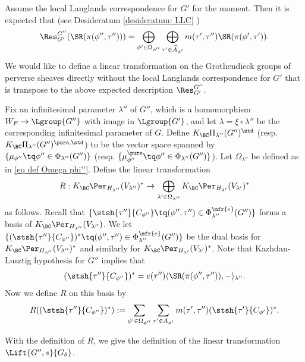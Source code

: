 \documentclass[11pt,letterpaper]{amsart}
\numberwithin{equation}{section}
\begin{document}
Assume the local Langlands correspondence for $G'$ for the moment. Then it is expected that (see Desideratum \ref{desideratum: LLC} \RES)
\[ \Res_{G'}^{G''} (\SR(\pi(\phi'', \tau'')))= \bigoplus_{\phi' \in \Omega_{\phi''} } \bigoplus_{\tau' \in  \widehat{A}_{\phi'}} m(\tau',\tau'') \SR(\pi(\phi', \tau')). \]
We would like to define a linear transformation on the Grothendieck groups of perverse sheaves directly without the local Langlands correspondence for $G'$ that is transpose to the above expected description $\Res_{G'}^{G''}$.

Fix an infinitesimal parameter $\lambda''$ of $G''$, which is a homomorphism $W_F \to \Lgroup{G''}$ with image in $\Lgroup{G'}$, and let $\lambda= \xi \circ \lambda''$ be the corresponding infinitesimal parameter of $G$.
Define $K_{\BC}\Pi_{\lambda''}(G'')^{\std}$ (resp. $K_{\BC}\Pi_{\lambda''}(G'')^{\pure,\std}$) to be the vector space spanned by $\{\mu_{\phi''} \tq \phi'' \in \Phi_{\lambda''}(G'')\}$ (resp. $\{\mu_{\phi''}^{\pure}\tq \phi'' \in \Phi_{\lambda''}(G'')\}$). Let $\Omega_{\lambda''}$ be defined as in \eqref{eq def Omega phi''}. 
Define the linear transformation 
\[ R: K_{\BC} \Per_{H_{\lambda''}}(V_{\lambda''})^{\ast} \to     \bigoplus_{\lambda' \in \Omega_{\lambda''}} K_{\BC} \Per_{H_{\lambda'}}(V_{\lambda'})^{\ast} \]
as follows. Recall that $\{\stsh{\tau''}{C_{\phi''}}\tq (\phi'',\tau'')\in \Phi_{\lambda''}^{\mfr{e}}(G'')\}$ forms a basis of $K_{\BC} \Per_{H_{\lambda''}}(V_{\lambda''})$. We let $\{ (\stsh{\tau''}{C_{\phi''}})^{\ast} \tq (\phi'',\tau'')\in \Phi_{\lambda''}^{\mfr{e}}(G'')\}$ be the dual basis for $K_{\BC} \Per_{H_{\lambda''}}(V_{\lambda''})^{\ast}$ and similarly for $K_{\BC} \Per_{H_{\lambda'}}(V_{\lambda'})^{\ast}$.
Note that Kazhdan-Lusztig hypothesis for $G''$ implies that
    \[  (\stsh{\tau''}{C_{\phi''}})^{\ast}= e(\tau'') \langle \SR(\pi(\phi'',\tau'')) ,-  \rangle_{\lambda''}.   \]
    Now we define $R$ on this basis by
\begin{align}\label{eq def of geometrization of finite index res}
    R( (\stsh{\tau''}{C_{\phi''}})^{\ast}):=  \sum_{\phi' \in \Omega_{\phi''}} \sum_{\tau' \in A_{\phi'}}  m(\tau',\tau'') (\stsh{\tau'}{C_{\phi'}})^{\ast}.
\end{align}

With the definition of $R$, we give the definition of the linear transformation $\Lift{G'',s}{G_{\delta}}$. 
\end{document}
